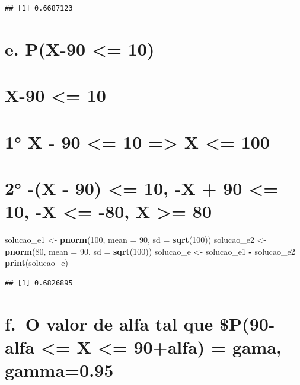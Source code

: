 \documentclass[
]{article}
\newenvironment{Shaded}{\begin{snugshade}}{\end{snugshade}}
\newcommand{\AttributeTok}[1]{\textcolor[rgb]{0.13,0.29,0.53}{#1}}
\newcommand{\DecValTok}[1]{\textcolor[rgb]{0.00,0.00,0.81}{#1}}
\newcommand{\FunctionTok}[1]{\textcolor[rgb]{0.13,0.29,0.53}{\textbf{#1}}}
\newcommand{\NormalTok}[1]{#1}
\newcommand{\OtherTok}[1]{\textcolor[rgb]{0.56,0.35,0.01}{#1}}
\newcommand{\SpecialCharTok}[1]{\textcolor[rgb]{0.81,0.36,0.00}{\textbf{#1}}}
\begin{document}
\begin{verbatim}
## [1] 0.6687123
\end{verbatim}

\section{e. P(\textbar X-90\textbar{} \textless= 10)}\label{e.-px-90-10}

\section{\textbar X-90\textbar{} \textless= 10}\label{x-90-10}

\section{1° X - 90 \textless= 10 =\textgreater{} X \textless=
100}\label{x---90-10-x-100}

\section{2° -(X - 90) \textless= 10, -X + 90 \textless= 10, -X
\textless= -80, X \textgreater=
80}\label{x---90-10--x-90-10--x--80-x-80}

\begin{Shaded}
\begin{Highlighting}[]
\NormalTok{solucao\_e1 }\OtherTok{\textless{}{-}} \FunctionTok{pnorm}\NormalTok{(}\DecValTok{100}\NormalTok{, }\AttributeTok{mean =} \DecValTok{90}\NormalTok{, }\AttributeTok{sd =} \FunctionTok{sqrt}\NormalTok{(}\DecValTok{100}\NormalTok{))}
\NormalTok{solucao\_e2 }\OtherTok{\textless{}{-}} \FunctionTok{pnorm}\NormalTok{(}\DecValTok{80}\NormalTok{, }\AttributeTok{mean =} \DecValTok{90}\NormalTok{, }\AttributeTok{sd =} \FunctionTok{sqrt}\NormalTok{(}\DecValTok{100}\NormalTok{))}
\NormalTok{solucao\_e }\OtherTok{\textless{}{-}}\NormalTok{ solucao\_e1 }\SpecialCharTok{{-}}\NormalTok{ solucao\_e2}
\FunctionTok{print}\NormalTok{(solucao\_e)}
\end{Highlighting}
\end{Shaded}

\begin{verbatim}
## [1] 0.6826895
\end{verbatim}

\section{f.~O valor de alfa tal que \$P(90-alfa \textless= X \textless=
90+alfa) = gama,
gamma=0.95}\label{f.-o-valor-de-alfa-tal-que-p90-alfa-x-90alfa-gama-gamma0.95}
\end{document}
